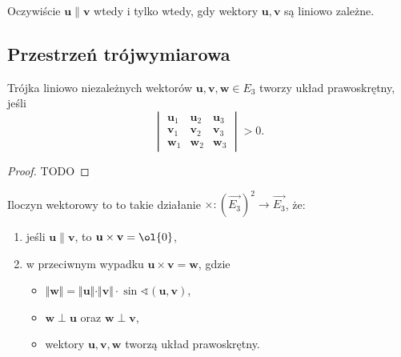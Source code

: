 Oczywiście $\mathbf{u} \parallel \mathbf{v}$ wtedy i tylko wtedy, gdy wektory $\mathbf{u}, \mathbf{v}$ są liniowo zależne.

\subsection{Przestrzeń trójwymiarowa}
\begin{fact}
    Trójka liniowo niezależnych wektorów $\mathbf{u}, \mathbf{v}, \mathbf{w} \in E_3$ tworzy układ prawoskrętny, jeśli
    \[ \begin{vmatrix}
        \mathbf{u}_1 & \mathbf{u}_2 & \mathbf{u}_3 \\
        \mathbf{v}_1 & \mathbf{v}_2 & \mathbf{v}_3 \\
        \mathbf{w}_1 & \mathbf{w}_2 & \mathbf{w}_3
    \end{vmatrix} > 0. \]
\end{fact}
\begin{proof}
    TODO
\end{proof}

\begin{definition}
    \label{d:cross product}
    Iloczyn wektorowy to to takie działanie $\times : (\overrightarrow{E_3})^2 \to \overrightarrow{E_3}$, że:
    \begin{enumerate}
        \item jeśli $\mathbf{u} \parallel \mathbf{v}$, to $\mathbf{u} \times \mathbf{v} = \ol{0}$,
        \item w przeciwnym wypadku $\mathbf{u} \times \mathbf{v} = \mathbf{w}$, gdzie
            \begin{itemize}
                \item $\Vert\mathbf{w}\Vert = \Vert\mathbf{u}\Vert \cdot \Vert\mathbf{v}\Vert\cdot\sin\sphericalangle(\mathbf{u}, \mathbf{v})$,
                \item $\mathbf{w} \perp \mathbf{u}$ oraz $\mathbf{w} \perp \mathbf{v}$,
                \item wektory $\mathbf{u}, \mathbf{v}, \mathbf{w}$ tworzą układ prawoskrętny.
            \end{itemize}
    \end{enumerate}
\end{definition}


